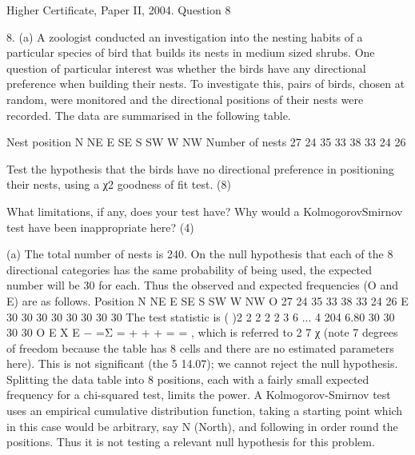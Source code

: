 \documentclass[a4paper,12pt]{article}
\begin{document}
Higher Certificate, Paper II, 2004. Question 8
\begin{framed}
8. (a) A zoologist conducted an investigation into the nesting habits of a particular species of bird that builds its nests in medium sized shrubs.  One question of particular interest was whether the birds have any directional preference when building their nests.  To investigate this, pairs of birds, chosen at random, were monitored and the directional positions of their nests were recorded.  The data are summarised in the following table. 
 
Nest position N NE E SE S SW W NW Number of nests 27 24 35 33 38 33 24 26 
 
Test the hypothesis that the birds have no directional preference in positioning their nests, using a χ2 goodness of fit test. (8) 
 
What limitations, if any, does your test have?  Why would a KolmogorovSmirnov test have been inappropriate here? (4) 
 \end{framed}

(a) The total number of nests is 240. On the null hypothesis that each of the 8
directional categories has the same probability of being used, the expected number
will be 30 for each. Thus the observed and expected frequencies (O and E) are as
follows.
Position N NE E SE S SW W NW
O 27 24 35 33 38 33 24 26
E 30 30 30 30 30 30 30 30
The test statistic is
( )2 2 2 2
2 3 6 ... 4 204 6.80
30 30 30 30
O E
X
E
−
=Σ = + + + = = ,
which is referred to 2
7 χ (note 7 degrees of freedom because the table has 8 cells and
there are no estimated parameters here). This is not significant (the 5%
14.07); we cannot reject the null hypothesis.
Splitting the data table into 8 positions, each with a fairly small expected frequency
for a chi-squared test, limits the power.
A Kolmogorov-Smirnov test uses an empirical cumulative distribution function,
taking a starting point which in this case would be arbitrary, say N (North), and
following in order round the positions. Thus it is not testing a relevant null hypothesis
for this problem.
\end{document}
